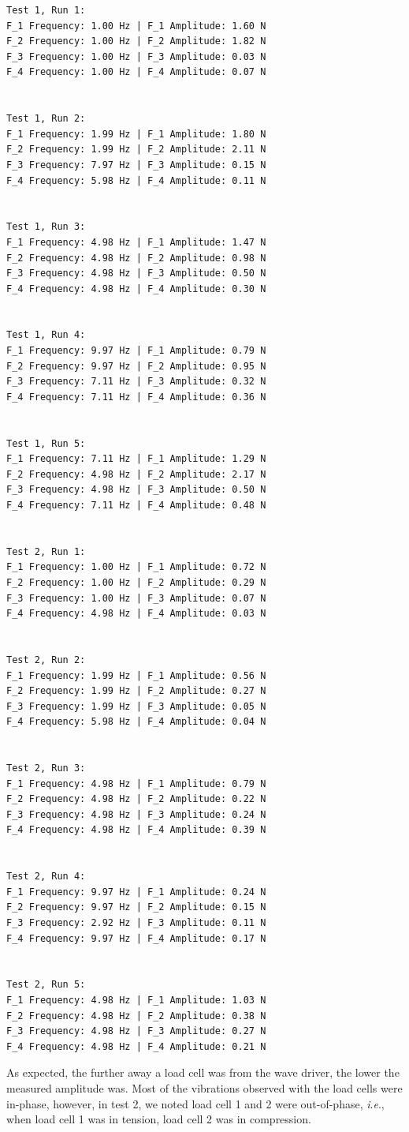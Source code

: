 \documentclass[12 pt]{report}
\newcommand{\ie}{\textit{i}.\textit{e}., }
\begin{document}
\begin{verbatim}
Test 1, Run 1:
F_1 Frequency: 1.00 Hz | F_1 Amplitude: 1.60 N
F_2 Frequency: 1.00 Hz | F_2 Amplitude: 1.82 N
F_3 Frequency: 1.00 Hz | F_3 Amplitude: 0.03 N
F_4 Frequency: 1.00 Hz | F_4 Amplitude: 0.07 N


Test 1, Run 2:
F_1 Frequency: 1.99 Hz | F_1 Amplitude: 1.80 N
F_2 Frequency: 1.99 Hz | F_2 Amplitude: 2.11 N
F_3 Frequency: 7.97 Hz | F_3 Amplitude: 0.15 N
F_4 Frequency: 5.98 Hz | F_4 Amplitude: 0.11 N


Test 1, Run 3:
F_1 Frequency: 4.98 Hz | F_1 Amplitude: 1.47 N
F_2 Frequency: 4.98 Hz | F_2 Amplitude: 0.98 N
F_3 Frequency: 4.98 Hz | F_3 Amplitude: 0.50 N
F_4 Frequency: 4.98 Hz | F_4 Amplitude: 0.30 N


Test 1, Run 4:
F_1 Frequency: 9.97 Hz | F_1 Amplitude: 0.79 N
F_2 Frequency: 9.97 Hz | F_2 Amplitude: 0.95 N
F_3 Frequency: 7.11 Hz | F_3 Amplitude: 0.32 N
F_4 Frequency: 7.11 Hz | F_4 Amplitude: 0.36 N


Test 1, Run 5:
F_1 Frequency: 7.11 Hz | F_1 Amplitude: 1.29 N
F_2 Frequency: 4.98 Hz | F_2 Amplitude: 2.17 N
F_3 Frequency: 4.98 Hz | F_3 Amplitude: 0.50 N
F_4 Frequency: 7.11 Hz | F_4 Amplitude: 0.48 N


Test 2, Run 1:
F_1 Frequency: 1.00 Hz | F_1 Amplitude: 0.72 N
F_2 Frequency: 1.00 Hz | F_2 Amplitude: 0.29 N
F_3 Frequency: 1.00 Hz | F_3 Amplitude: 0.07 N
F_4 Frequency: 4.98 Hz | F_4 Amplitude: 0.03 N


Test 2, Run 2:
F_1 Frequency: 1.99 Hz | F_1 Amplitude: 0.56 N
F_2 Frequency: 1.99 Hz | F_2 Amplitude: 0.27 N
F_3 Frequency: 1.99 Hz | F_3 Amplitude: 0.05 N
F_4 Frequency: 5.98 Hz | F_4 Amplitude: 0.04 N


Test 2, Run 3:
F_1 Frequency: 4.98 Hz | F_1 Amplitude: 0.79 N
F_2 Frequency: 4.98 Hz | F_2 Amplitude: 0.22 N
F_3 Frequency: 4.98 Hz | F_3 Amplitude: 0.24 N
F_4 Frequency: 4.98 Hz | F_4 Amplitude: 0.39 N


Test 2, Run 4:
F_1 Frequency: 9.97 Hz | F_1 Amplitude: 0.24 N
F_2 Frequency: 9.97 Hz | F_2 Amplitude: 0.15 N
F_3 Frequency: 2.92 Hz | F_3 Amplitude: 0.11 N
F_4 Frequency: 9.97 Hz | F_4 Amplitude: 0.17 N


Test 2, Run 5:
F_1 Frequency: 4.98 Hz | F_1 Amplitude: 1.03 N
F_2 Frequency: 4.98 Hz | F_2 Amplitude: 0.38 N
F_3 Frequency: 4.98 Hz | F_3 Amplitude: 0.27 N
F_4 Frequency: 4.98 Hz | F_4 Amplitude: 0.21 N
\end{verbatim}

As expected, the further away a load cell was from the wave driver, the lower the measured amplitude was. Most of the vibrations observed with the load cells were in-phase, however, in test \num{2}, we noted load cell \num{1} and \num{2} were out-of-phase, \ie when load cell \num{1} was in tension, load cell \num{2} was in compression.
\end{document}
